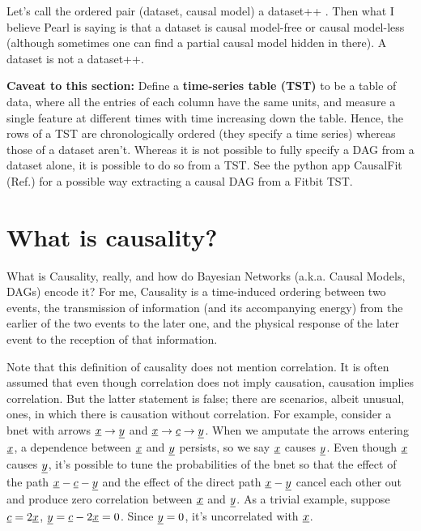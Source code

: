 Let’s call the ordered pair
(dataset, causal model) a
dataset++ . Then what I
believe Pearl is saying is that a
dataset is causal model-free or causal model-less
(although sometimes one can find a partial
causal model hidden in there). A dataset
is not a dataset++.

{\bf Caveat to this section:} Define a {\bf time-series table (TST)} to be
a table of data, where all the entries of each column have
the
same units, and measure a single feature at different times with time increasing down the table.
Hence, the rows of a TST are chronologically ordered (they 
specify a time series)
whereas those of a dataset aren't. Whereas it is not possible to
fully specify a DAG from a dataset alone, it is possible
to do so from a TST. See the python app CausalFit (Ref.\cite{CausalFitbit}) for a possible
way extracting a causal DAG from a Fitbit TST.

\section{What is causality?}
What is Causality, really, and how do Bayesian Networks
(a.k.a. Causal Models,
DAGs) encode it?
For me, Causality is a time-induced ordering between two events, the
transmission of information (and its accompanying
energy) from the earlier of the two events to the later
one, and the physical response of the later event to the reception of that
information. 

Note that this definition
of causality does not mention
correlation.
It is often assumed that even though
correlation does not imply causation,
causation implies correlation.
But the latter statement is false; there
are scenarios, albeit  unusual,
 ones,
in which there is causation
without correlation.
For example, 
consider a bnet 
with arrows $\rvx\rarrow \rvy$
and $\rvx\rarrow \rvc \rarrow \rvy$.
When we amputate 
the arrows entering $\rvx$,
a dependence
between $\rvx$ and $\rvy$ persists,
so we say $\rvx$ causes $\rvy$.
Even
though $\rvx$ causes $\rvy$,
it's possible to tune the 
probabilities
of the bnet so that
the effect of the path $\rvx-\rvc-\rvy$
and the effect of the direct path $\rvx-\rvy$
cancel 
each other out and
produce zero 
correlation between $\rvx$ and $\rvy$.
As a trivial example, suppose
$\rvc=2\rvx$, $\rvy=\rvc-2\rvx=0$.
Since $\rvy=0$, it's uncorrelated with $\rvx$.

